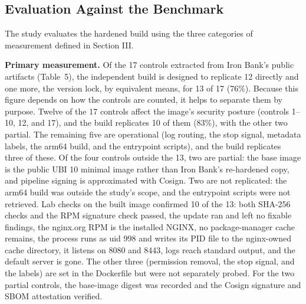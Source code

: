 \documentclass[10pt,letterpaper,twocolumn]{article}
\begin{document}
\subsection{Evaluation Against the Benchmark}

The study evaluates the hardened build using the three categories of measurement defined in Section III.

\textbf{Primary measurement.} Of the 17 controls extracted from Iron Bank's public artifacts (Table~5), the independent build is designed to replicate 12 directly and one more, the version lock, by equivalent means, for 13 of 17 (76\%). Because this figure depends on how the controls are counted, it helps to separate them by purpose. Twelve of the 17 controls affect the image's security posture (controls 1--10, 12, and 17), and the build replicates 10 of them (83\%), with the other two partial. The remaining five are operational (log routing, the stop signal, metadata labels, the arm64 build, and the entrypoint scripts), and the build replicates three of these. Of the four controls outside the 13, two are partial: the base image is the public UBI 10 minimal image rather than Iron Bank's re-hardened copy, and pipeline signing is approximated with Cosign. Two are not replicated: the arm64 build was outside the study's scope, and the entrypoint scripts were not retrieved. Lab checks on the built image confirmed 10 of the 13: both SHA-256 checks and the RPM signature check passed, the update ran and left no fixable findings, the nginx.org RPM is the installed NGINX, no package-manager cache remains, the process runs as uid 998 and writes its PID file to the nginx-owned cache directory, it listens on 8080 and 8443, logs reach standard output, and the default server is gone. The other three (permission removal, the stop signal, and the labels) are set in the Dockerfile but were not separately probed. For the two partial controls, the base-image digest was recorded and the Cosign signature and SBOM attestation verified.
\end{document}
